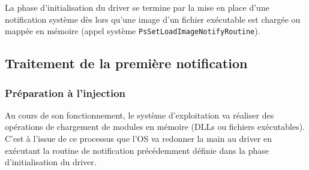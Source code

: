 \documentclass[times,11pt,fullpage]{article}
\begin{document}
La phase d'initialisation du driver se termine par la mise en place d'une notification système dès lors qu'une image d'un fichier exécutable est chargée ou mappée en mémoire (appel système \texttt{PsSetLoadImageNotifyRoutine}).
 
% 


\subsection{Traitement de la première notification}
\subsubsection{Préparation à l'injection}
Au cours de son fonctionnement, le système d'exploitation va réaliser des opérations de chargement de modules en mémoire (DLLs ou fichiers exécutables). C'est à l'issue de ce processus que l'OS va redonner la main au driver en exécutant la routine de notification précédemment définie dans la phase d'initialisation du driver.   
\end{document}
